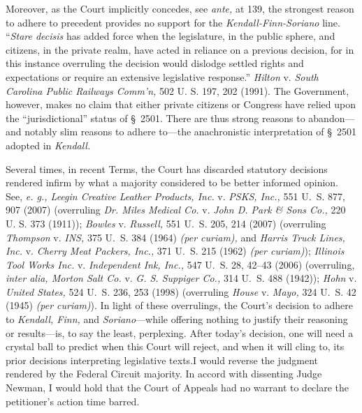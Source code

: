   Moreover, as the Court implicitly concedes, see \emph{ante,} at 139, the strongest reason to adhere to precedent provides no support for the \emph{Kendall-Finn-Soriano} line. ``\emph{Stare decisis} has added force when the legislature, in the public sphere, and citizens, in the private realm, have acted in reliance on a previous decision, for in this instance overruling the decision would dislodge settled rights and expectations or require an extensive legislative response.'' \emph{Hilton} v. \emph{South Carolina Public Railways Comm'n,} 502 U. S. 197, 202 (1991). The Government, however, makes no claim that either private citizens or Congress have relied upon the ``jurisdictional'' status of \S~2501. There are thus strong reasons to abandon---and notably slim reasons to adhere to---the anachronistic interpretation of \S~2501 adopted in \emph{Kendall.}

  Several times, in recent Terms, the Court has discarded statutory decisions rendered infirm by what a majority considered to be better informed opinion. See, \emph{e. g., Leegin Creative Leather Products, Inc.} v. \emph{PSKS, Inc.,} 551 U.~S. 877, 907 (2007) (overruling \emph{Dr. Miles Medical Co.} v. \emph{John D. Park \& Sons Co.,} 220 U. S. 373 (1911)); \emph{Bowles} v. \emph{Russell,} 551 U.~S. 205, 214 (2007) (overruling \emph{Thompson} v. \emph{INS,} 375 U.~S. 384 (1964) \emph{(per curiam),} and \emph{Harris Truck Lines, Inc.} v. \emph{Cherry Meat Packers, Inc.,} 371 U.~S. 215 (1962) \emph{(per curiam)}); \emph{Illinois Tool Works Inc.} v. \emph{Independent Ink, Inc.,} 547 U.~S. 28, 42--43 (2006) (overruling, \emph{inter alia, Morton Salt Co.} v. \emph{G. S. Suppiger Co.,} 314 U.~S. 488 (1942)); \emph{Hohn} v. \emph{United States,} 524 U.~S. 236, 253 (1998) (overruling \emph{House} v. \emph{Mayo,} 324 U.~S. 42 (1945) \emph{(per curiam)}). In light of these overrulings, the Court's decision to adhere to \emph{Kendall, Finn,} and \emph{Soriano}---while offering nothing to justify their reasoning or results---is, to say the least, perplexing. After today's decision, one will need a crystal ball to predict when this Court will reject, and when it will cling to, its prior decisions interpreting legislative texts.\newpage  I would reverse the judgment rendered by the Federal Circuit majority. In accord with dissenting Judge Newman, I would hold that the Court of Appeals had no warrant to declare the petitioner's action time barred.
